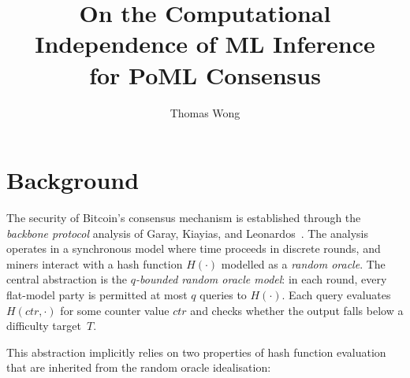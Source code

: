 \documentclass[11pt]{article}
\title{On the Computational Independence of ML Inference\\for PoML Consensus}
\author{Thomas Wong}
\begin{document}
\maketitle


\section{Background}
\label{sec:background}

The security of Bitcoin's consensus mechanism is established through the \emph{backbone protocol} analysis of Garay, Kiayias, and Leonardos~\cite{garay2015bitcoin}. The analysis operates in a synchronous model where time proceeds in discrete rounds, and miners interact with a hash function $H(\cdot)$ modelled as a \emph{random oracle}. The central abstraction is the \emph{$q$-bounded random oracle model}: in each round, every flat-model party is permitted at most $q$ queries to $H(\cdot)$. Each query evaluates $H(\mathit{ctr}, \cdot)$ for some counter value $\mathit{ctr}$ and checks whether the output falls below a difficulty target~$T$.

This abstraction implicitly relies on two properties of hash function evaluation that are inherited from the random oracle idealisation:
\end{document}
